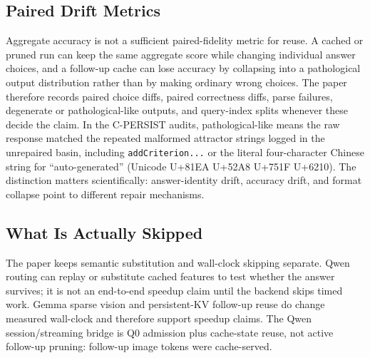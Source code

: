 \subsection{Paired Drift Metrics}

Aggregate accuracy is not a sufficient paired-fidelity metric for reuse. A cached or
pruned run can keep the same aggregate score while changing individual answer
choices, and a follow-up cache can lose accuracy by collapsing into a
pathological output distribution rather than by making ordinary wrong choices.
The paper therefore records paired choice diffs, paired correctness diffs,
parse failures, degenerate or pathological-like outputs, and query-index splits
whenever these decide the claim. In the C-PERSIST audits, pathological-like
means the raw response matched the repeated malformed attractor strings logged
in the unrepaired basin, including \texttt{addCriterion...} or the literal
four-character Chinese string for ``auto-generated'' (Unicode
U+81EA U+52A8 U+751F U+6210).
The distinction matters scientifically:
answer-identity drift, accuracy drift, and format collapse point to different
repair mechanisms.

\subsection{What Is Actually Skipped}

The paper keeps semantic substitution and wall-clock skipping separate. Qwen
routing can replay or substitute cached features to test whether the answer
survives; it is not an end-to-end speedup claim until the backend skips timed
work. Gemma sparse vision and persistent-KV follow-up reuse do change measured
wall-clock and therefore support speedup claims. The Qwen session/streaming
bridge is Q0 admission plus cache-state reuse, not active follow-up pruning:
follow-up image tokens were cache-served.


